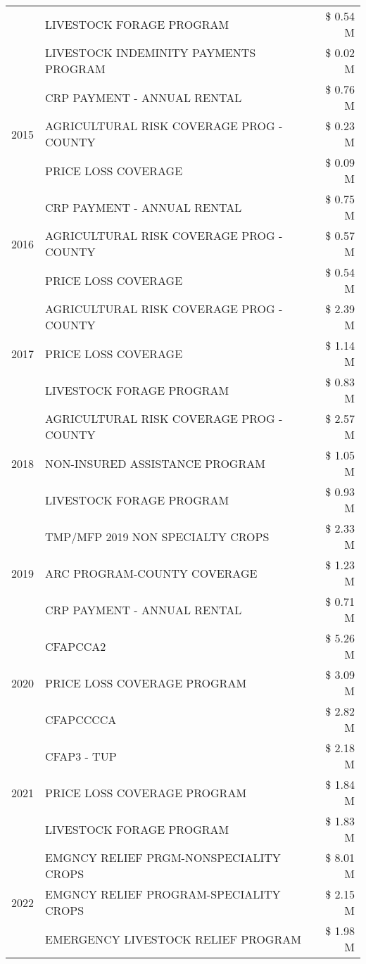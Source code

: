 \begin{tabular}{llr}
 & LIVESTOCK FORAGE PROGRAM & \$ 0.54 M \\
 & LIVESTOCK INDEMINITY PAYMENTS PROGRAM & \$ 0.02 M \\
\cline{1-3}
\multirow[t]{3}{*}{2015} & CRP PAYMENT - ANNUAL RENTAL & \$ 0.76 M \\
 & AGRICULTURAL RISK COVERAGE PROG - COUNTY & \$ 0.23 M \\
 & PRICE LOSS COVERAGE & \$ 0.09 M \\
\cline{1-3}
\multirow[t]{3}{*}{2016} & CRP PAYMENT - ANNUAL RENTAL & \$ 0.75 M \\
 & AGRICULTURAL RISK COVERAGE PROG - COUNTY & \$ 0.57 M \\
 & PRICE LOSS COVERAGE & \$ 0.54 M \\
\cline{1-3}
\multirow[t]{3}{*}{2017} & AGRICULTURAL RISK COVERAGE PROG - COUNTY & \$ 2.39 M \\
 & PRICE LOSS COVERAGE & \$ 1.14 M \\
 & LIVESTOCK FORAGE PROGRAM & \$ 0.83 M \\
\cline{1-3}
\multirow[t]{3}{*}{2018} & AGRICULTURAL RISK COVERAGE PROG - COUNTY & \$ 2.57 M \\
 & NON-INSURED ASSISTANCE PROGRAM & \$ 1.05 M \\
 & LIVESTOCK FORAGE PROGRAM & \$ 0.93 M \\
\cline{1-3}
\multirow[t]{3}{*}{2019} & TMP/MFP 2019 NON SPECIALTY CROPS & \$ 2.33 M \\
 & ARC PROGRAM-COUNTY COVERAGE & \$ 1.23 M \\
 & CRP PAYMENT - ANNUAL RENTAL & \$ 0.71 M \\
\cline{1-3}
\multirow[t]{3}{*}{2020} & CFAPCCA2 & \$ 5.26 M \\
 & PRICE LOSS COVERAGE PROGRAM & \$ 3.09 M \\
 & CFAPCCCCA & \$ 2.82 M \\
\cline{1-3}
\multirow[t]{3}{*}{2021} & CFAP3 - TUP & \$ 2.18 M \\
 & PRICE LOSS COVERAGE PROGRAM & \$ 1.84 M \\
 & LIVESTOCK FORAGE PROGRAM & \$ 1.83 M \\
\cline{1-3}
\multirow[t]{3}{*}{2022} & EMGNCY RELIEF PRGM-NONSPECIALITY CROPS & \$ 8.01 M \\
 & EMGNCY RELIEF PROGRAM-SPECIALITY CROPS & \$ 2.15 M \\
 & EMERGENCY LIVESTOCK RELIEF PROGRAM & \$ 1.98 M \\
\cline{1-3}
\bottomrule
\end{tabular}
